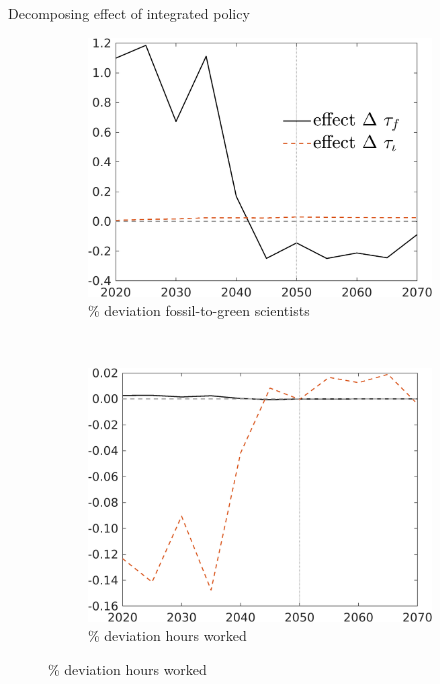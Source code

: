 \documentclass[11pt,aspectratio=169]{beamer}
\begin{document}
\begin{frame}{Decomposing effect of integrated policy }
	\hypertarget{mec0}{}
	\vspace{-3mm}
	\centering
	\begin{figure}
		\begin{subfigure}{0.45\textwidth}
			\caption{{\% deviation fossil-to-green scientists }}
			\includegraphics[width=1\textwidth]{../codding_model/own_basedOnFried/optimalPol_010922_revision/figures/all_13Sept22/NewCalib_polTaulFixedTaufJointPer_sffsg_Sun2_emnet1_spillover0_knspil3_xgr0_nsk0_sep0_extern0_PV1_etaa0.79_lgd1.png}
		\end{subfigure}
		\begin{minipage}[]{0.05\textwidth}
			\
		\end{minipage}
		\begin{subfigure}{0.45\textwidth}
			\caption{{\% deviation hours worked }}
			\includegraphics[width=1\textwidth]{../codding_model/own_basedOnFried/optimalPol_010922_revision/figures/all_13Sept22/NewCalib_polTaulFixedTaufJointPer_Hagg_Sun2_emnet1_spillover0_knspil3_xgr0_nsk0_sep0_extern0_PV1_etaa0.79_lgd0.png}

\end{subfigure}
\end{figure}
\end{frame}
\end{document}

